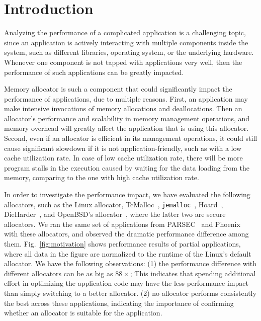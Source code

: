 

\section{Introduction}

Analyzing the performance of a complicated application is a challenging topic, since an application is actively interacting with multiple components inside the system, such as different libraries, operating system, or the underlying hardware. Whenever one component is not tapped with applications very well, then the performance of such applications can be greatly impacted. 

Memory allocator is such a component that could significantly impact the performance of applications, due to multiple reasons. First, an application may make intensive invocations of memory allocations and deallocations. Then an allocator's performance and scalability in memory management operations, and memory overhead will greatly affect the application that is using this allocator. Second, even if an allocator is efficient in its management operations, it could still cause significant slowdown if it is not application-friendly, such as with a low cache utilization rate. In case of low cache utilization rate, there will be more program stalls in the execution caused by waiting for the data loading from the memory, comparing to the one with high cache utilization rate.  


In order to investigate the performance impact, we have evaluated the following allocators, such as the Linux allocator, TcMalloc~\citep{TCMalloc}, \texttt{jemalloc}~\citep{jemalloc}, Hoard~\citep{Hoard}, DieHarder~\citep{DieHarder}, and OpenBSD's allocator~\citep{openbsd}, where the latter two are secure allocators. We ran the same set of applications from PARSEC~\citep{parsec} and Phoenix~\citep{phoenix} with these allocators, and observed the dramatic performance difference among them. Fig.~\ref{fig:motivation} shows performance results of partial applications, where all data in the figure are normalized to the runtime of the Linux's default allocator. We have the following observations: (1) the performance difference with different allocators can be as big as $88\times$; This indicates that spending additional effort in optimizing the application code may have the less performance impact than simply switching to a better allocator. (2) no allocator performs consistently the best across these applications, indicating the importance of confirming whether an allocator is suitable for the application. 

